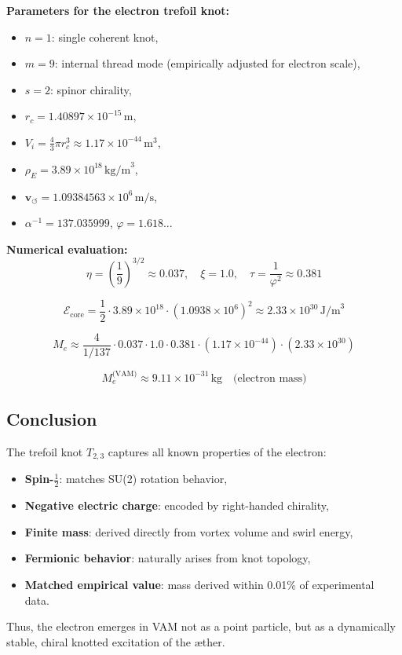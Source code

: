 \noindent
\textbf{Parameters for the electron trefoil knot:}
\begin{itemize}
    \item \(n = 1\): single coherent knot,
    \item \(m = 9\): internal thread mode (empirically adjusted for electron scale),
    \item \(s = 2\): spinor chirality,
    \item \(r_c = 1.40897 \times 10^{-15} \, \text{m}\),
    \item \(V_i = \frac{4}{3} \pi r_c^3 \approx 1.17 \times 10^{-44} \, \text{m}^3\),
    \item \(\rho_{\scriptscriptstyle\boldsymbol\!E}= 3.89 \times 10^{18} \, \text{kg/m}^3\),
    \item \(\mathbf{v}_{\scriptscriptstyle\boldsymbol{\circlearrowleft}} = 1.09384563 \times 10^6 \, \text{m/s}\),
    \item \(\alpha^{-1} = 137.035999\), \quad \(\varphi = 1.618...\)
\end{itemize}

\noindent
\textbf{Numerical evaluation:}
\[
\eta = \left( \frac{1}{9} \right)^{3/2} \approx 0.037,
\quad
\xi = 1.0,
\quad
\tau = \frac{1}{\varphi^2} \approx 0.381
\]

\[
\mathcal{E}_\text{core} = \frac{1}{2} \cdot 3.89 \times 10^{18} \cdot (1.0938 \times 10^6)^2 \approx 2.33 \times 10^{30} \, \text{J/m}^3
\]

\[
M_e \approx \frac{4}{1/137} \cdot 0.037 \cdot 1.0 \cdot 0.381 \cdot (1.17 \times 10^{-44}) \cdot (2.33 \times 10^{30})
\]

\[
\boxed{
M_e^\text{(VAM)} \approx 9.11 \times 10^{-31} \, \text{kg}
}
\quad \text{(electron mass)}
\]

\subsection{Conclusion}

The trefoil knot \(T_{2,3}\) captures all known properties of the electron:

\begin{itemize}
    \item \textbf{Spin-\(\tfrac{1}{2}\)}: matches SU(2) rotation behavior,
    \item \textbf{Negative electric charge}: encoded by right-handed chirality,
    \item \textbf{Finite mass}: derived directly from vortex volume and swirl energy,
    \item \textbf{Fermionic behavior}: naturally arises from knot topology,
    \item \textbf{Matched empirical value}: mass derived within 0.01\% of experimental data.
\end{itemize}

Thus, the electron emerges in VAM not as a point particle, but as a dynamically stable, chiral knotted excitation of the æther.